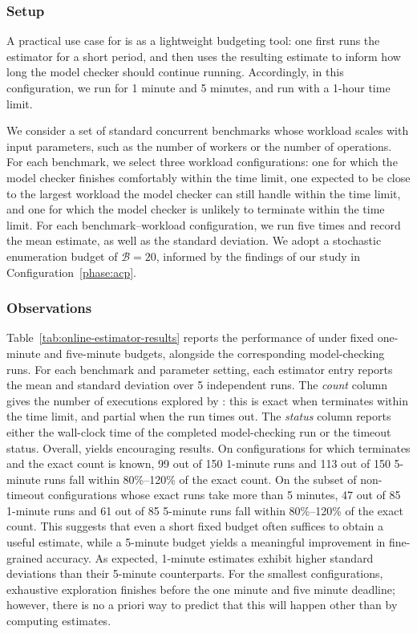 \subsubsection*{Setup}

A practical use case for \testor is as a lightweight budgeting tool: one first runs the estimator for a short period, and then uses the resulting estimate to inform how long the model checker should continue running.
Accordingly, in this configuration, we run \testor for 1 minute and 5 minutes, and run \jmc with a 1-hour time limit.

We consider a set of standard concurrent benchmarks whose workload scales with input parameters, such as the number of workers or the number of operations.
For each benchmark, we select three workload configurations: one for which the model checker finishes comfortably within the time limit, one expected to be close to the largest workload the model checker can still handle within the time limit, and one for which the model checker is unlikely to terminate within the time limit.
For each benchmark–workload configuration, we run \testor five times and record the mean estimate, as well as the standard deviation.
We adopt a stochastic enumeration budget of $\mathcal{B} = 20$, informed by the findings of our study in Configuration~\ref{phase:acp}.

\subsubsection*{Observations}
Table~\ref{tab:online-estimator-results} reports the performance of \testor under fixed one-minute and five-minute budgets, alongside the corresponding model-checking runs. For each benchmark and parameter setting, each estimator entry reports the mean and standard deviation over 5 independent runs. The \jmc \emph{count} column gives the number of executions explored by \jmc: this is exact when \jmc terminates within the time limit, and partial when the run times out. The \jmc \emph{status} column reports either the wall-clock time of the completed model-checking run or the timeout status.
Overall, \testor yields encouraging results. On configurations for which \jmc terminates and the exact count is known, 99 out of 150 1-minute runs and 113 out of 150 5-minute runs fall within 80\%–120\% of the exact count.
On the subset of non-timeout configurations whose exact \jmc runs take more than 5 minutes, 47 out of 85 1-minute runs and 61 out of 85 5-minute runs fall within 80\%–120\% of the exact count. This suggests that even a short fixed budget often suffices to obtain a useful estimate, while a 5-minute budget yields a meaningful improvement in fine-grained accuracy. As expected, 1-minute estimates exhibit higher standard deviations than their 5-minute counterparts.
For the smallest configurations, exhaustive exploration finishes before the one minute and five minute deadline; however, there is no a priori way to predict that this will happen other than by computing estimates.

